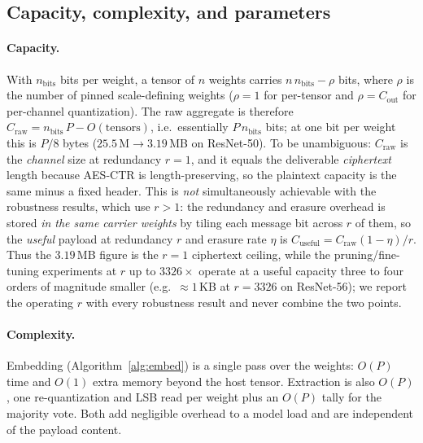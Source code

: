 \documentclass[a4paper,fleqn]{cas-dc}
\theoremstyle{plain}
\theoremstyle{remark}
\begin{document}
\subsection{Capacity, complexity, and parameters}\label{sec:analysis}
\paragraph{Capacity.} With $n_{\mathrm{bits}}$ bits per weight, a tensor of $n$ weights
carries $n\,n_{\mathrm{bits}}-\rho$ bits, where $\rho$ is the number of pinned
scale-defining weights ($\rho=1$ for per-tensor and $\rho=C_{\mathrm{out}}$ for
per-channel quantization). The raw aggregate is therefore
$C_{\mathrm{raw}}=n_{\mathrm{bits}}\,P-O(\text{tensors})$, i.e.\ essentially
$P\,n_{\mathrm{bits}}$ bits; at one bit per weight this is $P/8$ bytes
($25.5\,\mathrm{M}\to 3.19$\,MB on ResNet-50). To be unambiguous: $C_{\mathrm{raw}}$ is the
\emph{channel} size at redundancy $r=1$, and it equals the deliverable \emph{ciphertext}
length because AES-CTR is length-preserving, so the plaintext capacity is the same minus a
fixed header. This is \emph{not} simultaneously achievable with the robustness results, which
use $r>1$: the redundancy and erasure overhead is stored \emph{in the same carrier weights}
by tiling each message bit across $r$ of them, so the \emph{useful} payload at redundancy $r$
and erasure rate $\eta$ is $C_{\mathrm{useful}}=C_{\mathrm{raw}}(1-\eta)/r$. Thus the
$3.19$\,MB figure is the $r{=}1$ ciphertext ceiling, while the pruning/fine-tuning experiments
at $r$ up to $3326\times$ operate at a useful capacity three to four orders of magnitude
smaller (e.g.\ $\approx 1$\,KB at $r{=}3326$ on ResNet-56); we report the operating $r$ with
every robustness result and never combine the two points.

\paragraph{Complexity.} Embedding (Algorithm~\ref{alg:embed}) is a single pass over the
weights: $O(P)$ time and $O(1)$ extra memory beyond the host tensor. Extraction is also
$O(P)$, one re-quantization and LSB read per weight plus an $O(P)$ tally for the majority
vote. Both add negligible overhead to a model load and are independent of the payload
content.
\end{document}
